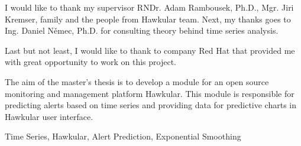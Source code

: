 \documentclass[12pt,oneside]{fithesis2}
\begin{document}
\FrontMatter                    %
\ThesisTitlePage                %
\begin{ThesisDeclaration}       %
  \DeclarationText
  \AdvisorName
\end{ThesisDeclaration}

\begin{ThesisThanks}            %
  I would like to thank my supervisor RNDr. Adam Rambousek, Ph.D., Mgr. Jiri Kremser,
  family and the people from Hawkular team. Next, my thanks goes to Ing. Daniel Němec, Ph.D.
  for consulting theory behind time series analysis.

  Last but not least, I would like to thank to company Red Hat that provided me 
  with great opportunity to work on this project.
\end{ThesisThanks}

\begin{ThesisAbstract}          %
  The aim of the master's thesis is to develop a module for an open source monitoring
  and management platform Hawkular. This module is responsible for predicting
  alerts based on time series and providing data for predictive charts in Hawkular user interface.
\end{ThesisAbstract}

\begin{ThesisKeyWords}          %
  Time Series, Hawkular, Alert Prediction, Exponential Smoothing
\end{ThesisKeyWords}

\tableofcontents                %

\MainMatter                     %




%

\appendix

\end{document}
